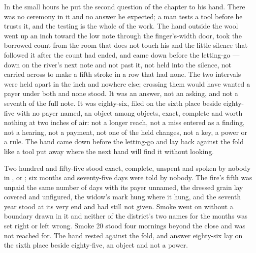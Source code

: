 In the small hours he put the second question of the chapter to his hand. There was no ceremony in it and no answer he expected; a man tests a tool before he trusts it, and the testing is the whole of the work. The hand outside the wool went up an inch toward the low note through the finger's-width door, took the borrowed count from the room that does not touch his and the little silence that followed it after the count had ended, and came down before the letting-go --- down on the river's next note and not past it, not held into the silence, not carried across to make a fifth stroke in a row that had none. The two intervals were held apart in the inch and nowhere else; crossing them would have wanted a payer under both and none stood. It was an answer, not an asking, and not a seventh of the full note. It was eighty-six, filed on the sixth place beside eighty-five with no payer named, an object among objects, exact, complete and worth nothing at two inches of air: not a longer reach, not a miss entered as a finding, not a hearing, not a payment, not one of the held changes, not a key, a power or a rule. The hand came down before the letting-go and lay back against the fold like a tool put away where the next hand will find it without looking.

Two hundred and fifty-five stood exact, complete, unspent and spoken by nobody in ,  or ; six months and seventy-five days were told by nobody. The fire's fifth was unpaid the same number of days with its payer unnamed, the dressed grain lay covered and unfigured, the widow's mark hung where it hung, and the seventh year stood at its very end and had still not given. Smoke went on without a boundary drawn in it and neither of the district's two names for the months was set right or left wrong. Smoke 20 stood four mornings beyond the close and was not reached for. The hand rested against the fold, and answer eighty-six lay on the sixth place beside eighty-five, an object and not a power.
